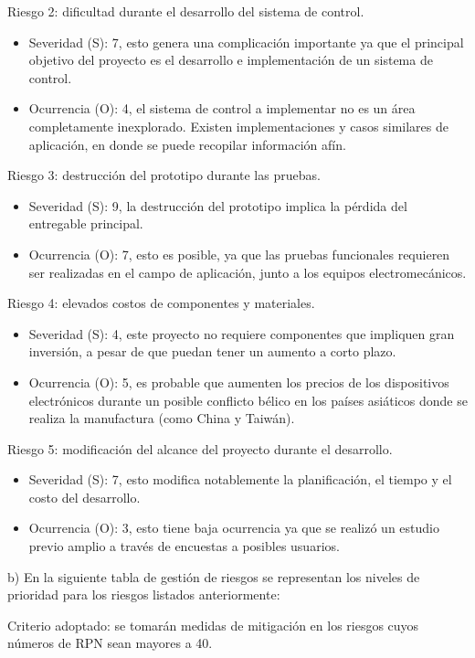 \documentclass[
11pt, %
]{charter}
\begin{document}
Riesgo 2: dificultad durante el desarrollo del sistema de control.
\begin{itemize}
	\item Severidad (S): 7, esto genera una complicación importante ya que el principal objetivo del proyecto es el desarrollo e implementación de un sistema de control.
	\item Ocurrencia (O): 4, el sistema de control a implementar no es un área completamente inexplorado. Existen implementaciones y casos similares de aplicación, en donde se puede recopilar información afín.
\end{itemize}

Riesgo 3: destrucción del prototipo durante las pruebas.
\begin{itemize}
	\item Severidad (S): 9, la destrucción del prototipo implica la pérdida del entregable principal.
	\item Ocurrencia (O): 7, esto es posible, ya que las pruebas funcionales requieren ser realizadas en el campo de aplicación, junto a los equipos electromecánicos.
\end{itemize}

Riesgo 4: elevados costos de componentes y materiales.
\begin{itemize}
	\item Severidad (S): 4, este proyecto no requiere componentes que impliquen gran inversión, a pesar de que puedan tener un aumento a corto plazo.
	\item Ocurrencia (O): 5, es probable que aumenten los precios de los dispositivos electrónicos durante un posible conflicto bélico en los países asiáticos donde se realiza la manufactura (como China y Taiwán).
\end{itemize}

Riesgo 5: modificación del alcance del proyecto durante el desarrollo.
\begin{itemize}
	\item Severidad (S): 7, esto modifica notablemente la planificación, el tiempo y el costo del desarrollo.
	\item Ocurrencia (O): 3, esto tiene baja ocurrencia ya que se realizó un estudio previo amplio a través de encuestas a posibles usuarios.
\end{itemize}

b) En la siguiente tabla de gestión de riesgos se representan los niveles de prioridad para los riesgos listados anteriormente:

Criterio adoptado: se tomarán medidas de mitigación en los riesgos cuyos números de RPN sean mayores a 40. 
\end{document}
